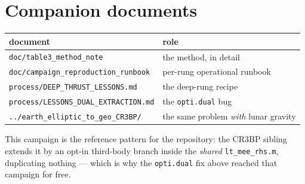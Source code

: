 \documentclass[11pt]{article}
\newcommand{\file}[1]{\texttt{#1}}
\begin{document}
\section{Companion documents}

\begin{center}
\begin{tabular}{ll}
\toprule
document & role \\
\midrule
\file{doc/table3\_method\_note} & the method, in detail \\
\file{doc/campaign\_reproduction\_runbook} & per-rung operational runbook \\
\file{process/DEEP\_THRUST\_LESSONS.md} & the deep-rung recipe \\
\file{process/LESSONS\_DUAL\_EXTRACTION.md} & the \texttt{opti.dual} bug \\
\file{../earth\_elliptic\_to\_geo\_CR3BP/} & the same problem \emph{with} lunar gravity \\
\bottomrule
\end{tabular}
\end{center}

This campaign is the reference pattern for the repository: the CR3BP sibling
extends it by an opt-in third-body branch inside the \emph{shared}
\file{lt\_mee\_rhs.m}, duplicating nothing --- which is why the
\texttt{opti.dual} fix above reached that campaign for free.
\end{document}
